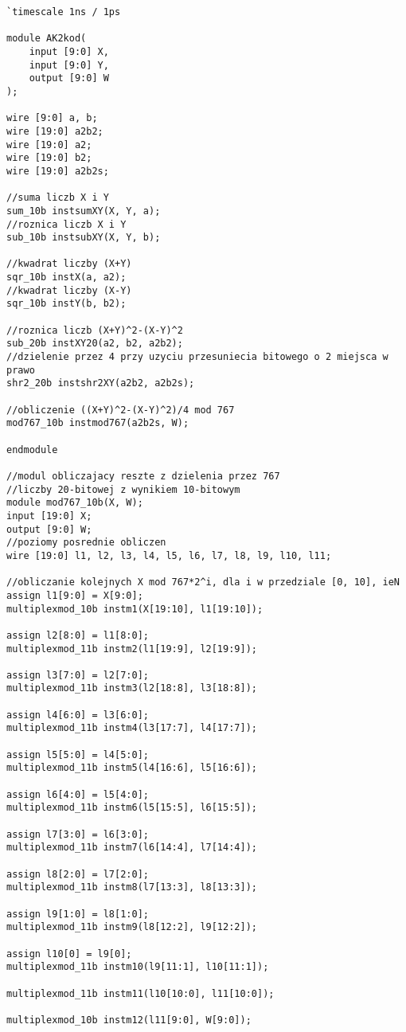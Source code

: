 \documentclass[a4paper]{article}
\begin{document}
\begin{lstlisting}[label=calosc]
`timescale 1ns / 1ps

module AK2kod(
	input [9:0] X,
	input [9:0] Y,
	output [9:0] W
);

wire [9:0] a, b;
wire [19:0] a2b2;
wire [19:0] a2;
wire [19:0] b2;
wire [19:0] a2b2s;

//suma liczb X i Y
sum_10b instsumXY(X, Y, a);
//roznica liczb X i Y
sub_10b instsubXY(X, Y, b);

//kwadrat liczby (X+Y)
sqr_10b instX(a, a2);
//kwadrat liczby (X-Y)
sqr_10b instY(b, b2);

//roznica liczb (X+Y)^2-(X-Y)^2
sub_20b instXY20(a2, b2, a2b2);
//dzielenie przez 4 przy uzyciu przesuniecia bitowego o 2 miejsca w prawo
shr2_20b instshr2XY(a2b2, a2b2s);

//obliczenie ((X+Y)^2-(X-Y)^2)/4 mod 767
mod767_10b instmod767(a2b2s, W);

endmodule

//modul obliczajacy reszte z dzielenia przez 767 
//liczby 20-bitowej z wynikiem 10-bitowym
module mod767_10b(X, W);
input [19:0] X;
output [9:0] W;
//poziomy posrednie obliczen
wire [19:0] l1, l2, l3, l4, l5, l6, l7, l8, l9, l10, l11;

//obliczanie kolejnych X mod 767*2^i, dla i w przedziale [0, 10], ieN
assign l1[9:0] = X[9:0];
multiplexmod_10b instm1(X[19:10], l1[19:10]);

assign l2[8:0] = l1[8:0];
multiplexmod_11b instm2(l1[19:9], l2[19:9]);

assign l3[7:0] = l2[7:0];
multiplexmod_11b instm3(l2[18:8], l3[18:8]);

assign l4[6:0] = l3[6:0];
multiplexmod_11b instm4(l3[17:7], l4[17:7]);

assign l5[5:0] = l4[5:0];
multiplexmod_11b instm5(l4[16:6], l5[16:6]);

assign l6[4:0] = l5[4:0];
multiplexmod_11b instm6(l5[15:5], l6[15:5]);

assign l7[3:0] = l6[3:0];
multiplexmod_11b instm7(l6[14:4], l7[14:4]);

assign l8[2:0] = l7[2:0];
multiplexmod_11b instm8(l7[13:3], l8[13:3]);

assign l9[1:0] = l8[1:0];
multiplexmod_11b instm9(l8[12:2], l9[12:2]);

assign l10[0] = l9[0];
multiplexmod_11b instm10(l9[11:1], l10[11:1]);

multiplexmod_11b instm11(l10[10:0], l11[10:0]);

multiplexmod_10b instm12(l11[9:0], W[9:0]);


\end{lstlisting}
\end{document}
